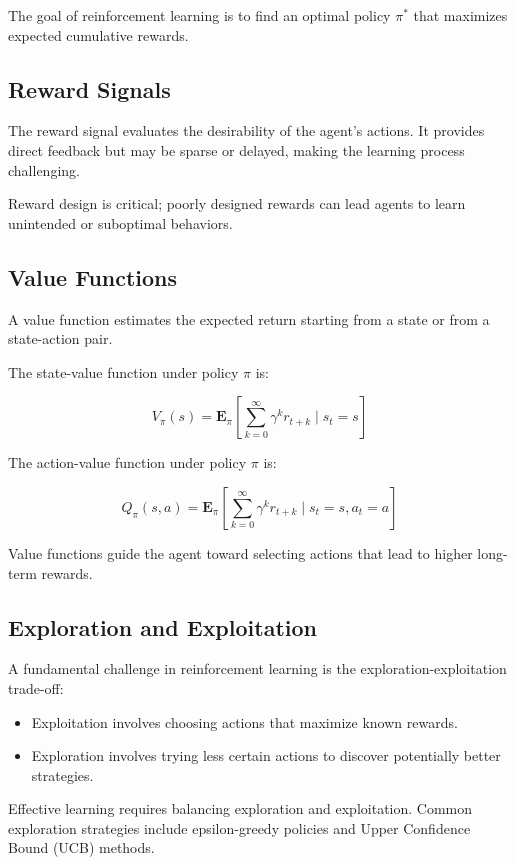 \documentclass[openany]{book}
\begin{document}
The goal of reinforcement learning is to find an optimal policy \( \pi^* \) that 
maximizes expected cumulative rewards.

\subsection{Reward Signals}

The reward signal evaluates the desirability of the agent's actions. It provides 
direct feedback but may be sparse or delayed, making the learning process 
challenging.

Reward design is critical; poorly designed rewards can lead agents to learn 
unintended or suboptimal behaviors.

\subsection{Value Functions}

A value function estimates the expected return starting from a state or from a 
state-action pair.

The state-value function under policy \( \pi \) is:

\[
V_\pi(s) = \mathbf{E}_\pi \left[ \sum_{k=0}^{\infty} \gamma^k r_{t+k} 
\mid s_t = s \right]
\]

The action-value function under policy \( \pi \) is:

\[
Q_\pi(s, a) = \mathbf{E}_\pi \left[ \sum_{k=0}^{\infty} \gamma^k r_{t+k} 
\mid s_t = s, a_t = a \right]
\]

Value functions guide the agent toward selecting actions that lead to higher 
long-term rewards.

\subsection{Exploration and Exploitation}

A fundamental challenge in reinforcement learning is the 
exploration-exploitation trade-off:

\begin{itemize}
    \item Exploitation involves choosing actions that maximize known rewards.
    \item Exploration involves trying less certain actions to discover 
    potentially better strategies.
\end{itemize}

Effective learning requires balancing exploration and exploitation. Common 
exploration strategies include epsilon-greedy policies and Upper Confidence 
Bound (UCB) methods.
\end{document}
